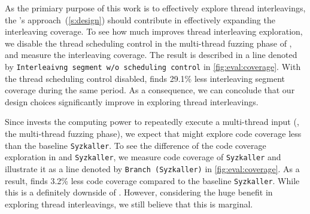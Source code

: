%
As the primiary purpose of this work is to effectively explore thread
interleavings, the \sys's approach~(\autoref{s:design}) should
contribute in effectively expanding the interleaving coverage.
%
To see how much \sys improves thread interleaving exploration, we
disable the thread scheduling control in the multi-thread fuzzing
phase of \sys, and measure the interleaving coverage.
%
The result is described in a line denoted by \texttt{Interleaivng
  segment w/o scheduling control} in \autoref{fig:eval:coverage}.
%
With the thread scheduling control disabled, \sys finds 29.1\% less
interleaving segment coverage during the same period.
%
As a consequence, we can concolude that our design choices
significantly improve in exploring thread interleavings.
%



%
Since \sys invests the computing power to repeatedly execute a
multi-thread input (\ie, the multi-thread fuzzing phase), we expect
that \sys might explore code coverage less than the baseline
\texttt{Syzkaller}.
%
To see the difference of the code coverage exploration in \sys and
\texttt{Syzkaller}, we measure code coverage of \texttt{Syzkaller} and
illustrate it as a line denoted by \texttt{Branch (Syzkaller)} in
\autoref{fig:eval:coverage}.
%
As a result, \sys finds 3.2\% less code coverage compared to the
baseline \texttt{Syzkaller}.
%
While this is a definitely downside of \sys. However, considering the
huge benefit in exploring thread interleavings, we still believe that
this is marginal.





